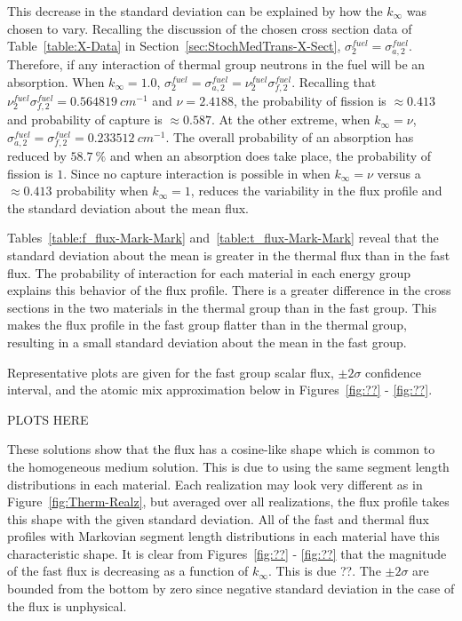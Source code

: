 \noindent
	\indent This decrease in the standard deviation can be explained by how the ${k_{\infty}}$
	was chosen to vary.  Recalling the discussion of the chosen cross section data of 
	Table~\ref{table:X-Data} in Section~\ref{sec:StochMedTrans-X-Sect}, ${\sigma_2^{fuel} = 
	\sigma_{a,2}^{fuel}}$.  Therefore, if any interaction of thermal group neutrons in the fuel
	will be an absorption.  When ${k_{\infty}=1.0}$, ${\sigma_2^{fuel} = \sigma_{a,2}^{fuel} = 
	\nu_2^{fuel}\sigma_{f,2}^{fuel}}$.  Recalling that ${\nu_2^{fuel}\sigma_{f,2}^{fuel} = 
	0.564819 \ cm^{-1}}$ and ${\nu = 2.4188}$, the probability of fission is
	${\approx0.413}$ and probability of capture is ${\approx0.587}$.  At the other extreme, when
	${k_{\infty}} = \nu$, ${\sigma_{a,2}^{fuel} = \sigma_{f,2}^{fuel} = 0.233512 \ cm^{-1}}$.  The 
	overall probability of an absorption has reduced by ${58.7 \ \%}$ and when an absorption
	does take place, the probability of fission is ${1}$.  Since no capture interaction is possible
	in when ${k_{\infty} = \nu}$ versus a ${\approx0.413}$ probability when ${k_{\infty} = 1}$, 
	reduces the variability in the flux profile and the standard deviation about the mean flux.  
	
\noindent
	\indent Tables~\ref{table:f_flux-Mark-Mark} and~\ref{table:t_flux-Mark-Mark} reveal that the 
	standard deviation about the mean is greater in the thermal flux than in the fast flux.  The 
	probability of interaction for each material in each energy group explains this behavior of
	the flux profile.  There is a greater difference in the cross sections in the two materials in the
	thermal group than in the fast group.  This makes the flux profile in the fast group flatter
	than in the thermal group, resulting in a small standard deviation about the mean in the 
	fast group.
   
\noindent
	\indent Representative plots are given for the fast group scalar flux, ${\pm 2\sigma}$ confidence
	interval, and the atomic mix approximation below in Figures~\ref{fig:??} - 
	\ref{fig:??}.
	
	PLOTS HERE
	
	These solutions show that the flux has a cosine-like shape which is common to the
	homogeneous medium solution.  This is due to using the same segment length distributions
	in each material.  Each realization may look very different as in Figure~\ref{fig:Therm-Realz}, 
	but averaged over all realizations, the flux profile takes this shape with the given standard
	deviation.  All of the fast and thermal flux profiles with Markovian segment length distributions
	in each material have this characteristic shape.  It is clear from Figures~\ref{fig:??} - 
	\ref{fig:??} that the magnitude of the fast flux is decreasing as a function of ${k_{\infty}}$.  This
	is due ??.  The ${\pm 2\sigma}$ are bounded from the bottom by zero since negative 
	standard deviation in the case of the flux is unphysical.
	
